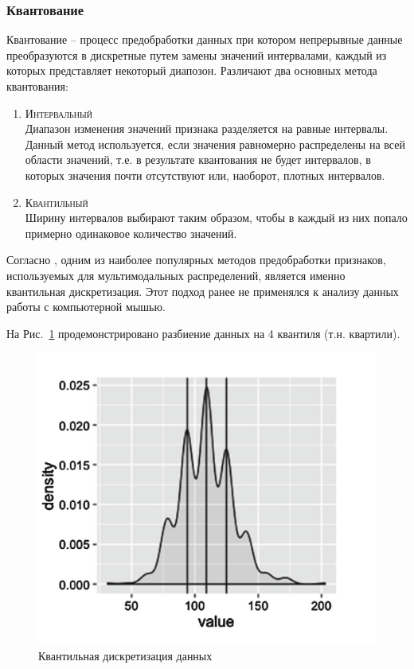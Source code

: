 \documentclass[12pt]{article}
\begin{document}
    \subsubsection{Квантование}
    \label{sec:Research:FeatureSpace:Quantile}

    \par Квантование \cite{BINNING} -- процесс предобработки данных при котором непрерывные данные преобразуются в дискретные путем замены значений интервалами, каждый из которых представляет некоторый диапозон. Различают два основных метода квантования:

    \begin{enumerate}
        \item \textsc{Интервальный} \\
        Диапазон изменения значений признака разделяется на равные интервалы. Данный метод используется, если значения равномерно распределены на всей области значений, т.е. в результате квантования не будет интервалов, в которых значения почти отсутствуют или, наоборот, плотных интервалов.
        \item \textsc{Квантильный} \\
        Ширину интервалов выбирают таким образом, чтобы в каждый из них попало примерно одинаковое количество значений.
    \end{enumerate}

    \par Согласно \cite{Kazachuk}, одним из наиболее популярных методов предобработки признаков, используемых для мультимодальных распределений, является именно квантильная дискретизация. Этот подход ранее не применялся к анализу данных работы с компьютерной мышью.

    \par На Рис.~\ref{sec:Research:FeatureSpace:Quantile:fig:Quantile} продемонстрировано разбиение данных на 4 квантиля (т.н. квартили).

    \begin{figure}[h!]
        \centering
        \includegraphics[width=0.5\linewidth]{quantile.png}
        \caption{Квантильная дискретизация данных}
        \label{sec:Research:FeatureSpace:Quantile:fig:Quantile}
    \end{figure}
\end{document}

